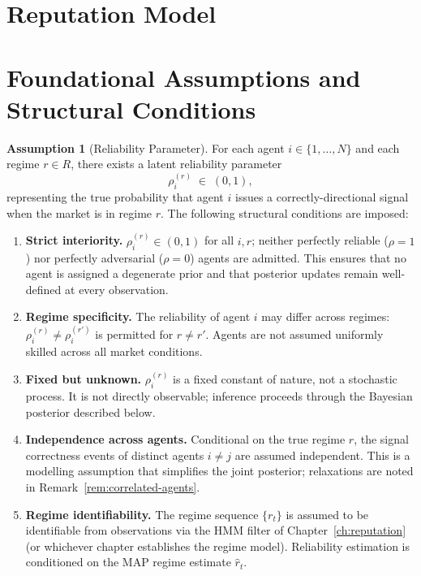 \documentclass[12pt,openany]{book}
\numberwithin{equation}{chapter}
\theoremstyle{plain}
\theoremstyle{definition}
\newtheorem{assumption}[theorem]{Assumption}
\theoremstyle{remark}
\numberwithin{equation}{chapter}
\theoremstyle{plain}
\newcommand{\calR}{\mathcal{R}}
\def\calR{R}%
\begin{document}
\section{Reputation Model}

\section{Foundational Assumptions and Structural Conditions}

\begin{assumption}[Reliability Parameter]
\label{asm:reliability}
For each agent $i \in \{1,\ldots,N\}$ and each regime
$r \in \calR$, there exists a latent reliability parameter
\begin{equation}
  \rho_i^{(r)} \;\in\; (0,1),
  \label{eq:rho-domain}
\end{equation}
representing the true probability that agent $i$ issues a
correctly-directional signal when the market is in regime $r$.
The following structural conditions are imposed:
\begin{enumerate}
  \item[\textup{(i)}] \textbf{Strict interiority.}
        $\rho_i^{(r)} \in (0,1)$ for all $i,r$; neither
        perfectly reliable ($\rho = 1$) nor perfectly
        adversarial ($\rho = 0$) agents are admitted.
        This ensures that no agent is assigned a degenerate
        prior and that posterior updates remain well-defined
        at every observation.

  \item[\textup{(ii)}] \textbf{Regime specificity.}
        The reliability of agent $i$ may differ across
        regimes: $\rho_i^{(r)} \neq \rho_i^{(r')}$ is
        permitted for $r \neq r'$.  Agents are not assumed
        uniformly skilled across all market conditions.

  \item[\textup{(iii)}] \textbf{Fixed but unknown.}
        $\rho_i^{(r)}$ is a fixed constant of nature,
        not a stochastic process.  It is not directly
        observable; inference proceeds through the
        Bayesian posterior described below.

  \item[\textup{(iv)}] \textbf{Independence across agents.}
        Conditional on the true regime $r$, the signal
        correctness events of distinct agents $i \neq j$ are
        assumed independent.  This is a modelling
        assumption that simplifies the joint posterior;
        relaxations are noted in Remark~\ref{rem:correlated-agents}.

  \item[\textup{(v)}] \textbf{Regime identifiability.}
        The regime sequence $\{r_t\}$ is assumed to be
        identifiable from observations via the HMM filter
        of Chapter~\ref{ch:reputation} (or whichever chapter
        establishes the regime model).  Reliability
        estimation is conditioned on the MAP regime
        estimate $\hat{r}_t$.
\end{enumerate}
\end{assumption}
\end{document}
